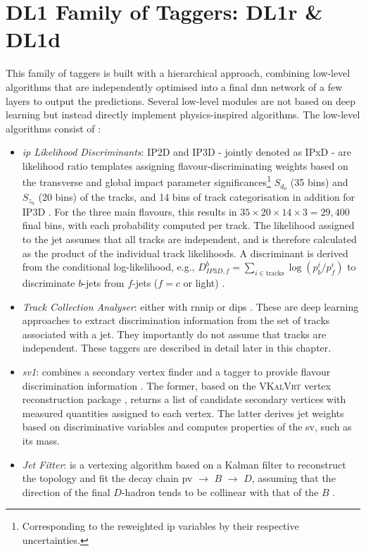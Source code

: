 \section{DL1 Family of Taggers: DL1r \& DL1d}
This family of taggers is built with a hierarchical approach, combining low-level algorithms that are independently optimised into a final \gls{dnn} network of a few layers to output the predictions. Several low-level modules are not based on deep learning but instead directly implement physics-inspired algorithms. The low-level algorithms consist of \cite{atlas:FTAGRUN2, Paganini:2289214}:
\begin{itemize}
  \item \textit{\gls{ip} Likelihood Discriminants}: IP2D and IP3D - jointly denoted as IPxD - are likelihood ratio templates assigning flavour-discriminating weights based on the transverse and global impact parameter significances\footnote{Corresponding to the reweighted \gls{ip} variables by their respective uncertainties.} $S_{d_0}$ (35 bins) and $S_{z_0}$ (20 bins) of the tracks, and 14 bins of track categorisation in addition for IP3D \cite{ATLAS:2017bcq}. For the three main flavours, this results in $35 \times 20 \times 14 \times 3 = 29,400$ final bins, with each probability computed per track. The likelihood assigned to the jet assumes that all tracks are independent, and is therefore calculated as the product of the individual track likelihoods. A discriminant is derived from the conditional log-likelihood, e.g., $D^b_{IP3D,f} = \sum_{i \in \textrm{tracks}} \log (p_b^i / p_f^i)$ to discriminate $b$-jets from $f$-jets ($f= c$ or light) \cite{ATL-PHYS-PUB-2015-022}.
  \item \textit{Track Collection Analyser}: either with \gls{rnnip} \cite{ATL-PHYS-PUB-2017-003} or \gls{dips} \cite{ATL-PHYS-PUB-2020-014}. These are deep learning approaches to extract discrimination information from the set of tracks associated with a jet. They importantly do not assume that tracks are independent. These taggers are described in detail later in this chapter. 
  \item \textit{\gls{sv1}}: combines a secondary vertex finder and a tagger to provide flavour discrimination information \cite{atlas:FTAGRUN2}. The former, based on the \textsc{VKalVrt} vertex reconstruction package \cite{Kostyukhin:685551}, returns a list of candidate secondary vertices with measured quantities assigned to each vertex. The latter derives jet weights based on discriminative variables and computes properties of the \gls{sv}, such as its mass. 
  \item \textit{Jet Fitter}: is a vertexing algorithm based on a Kalman filter to reconstruct the topology and fit the decay chain \gls{pv} $\rightarrow$ $B$ $\rightarrow$ $D$, assuming that the direction of the final $D$-hadron tends to be collinear with that of the $B$ \cite{atlas:FTAGRUN2, ATL-PHYS-PUB-2018-025}. 
\end{itemize}

